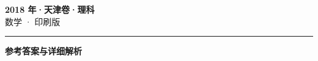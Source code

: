 \documentclass[zihao=5, a4paper]{ctexart}
\begin{document}
\begin{center}
  {\Large\bfseries 2018 年·天津卷·理科}\\[4pt]
  {\large 数学 · 印刷版}
\end{center}
\medskip
{}

\par\bigskip\hrule\bigskip
{}
\begin{center}{\large\bfseries 参考答案与详细解析}\end{center}
\smallskip

\end{document}
